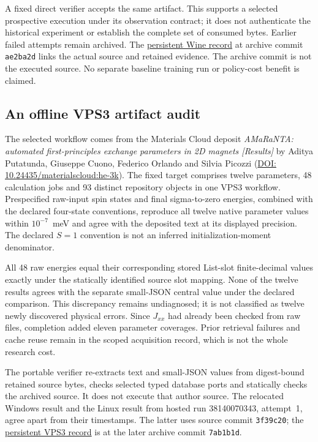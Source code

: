 \documentclass[pdflatex,sn-mathphys-num]{sn-jnl}
\theoremstyle{thmstyleone}
\theoremstyle{thmstylethree}
\theoremstyle{thmstyletwo}
\begin{document}
A fixed direct verifier accepts the same artifact. This supports a selected prospective execution under its observation contract; it does not authenticate the historical experiment or establish the complete set of consumed bytes. Earlier failed attempts remain archived. The \href{https://github.com/SHiJiE1115/newproj/blob/ae2ba2d6bd62dd7e7152f519d49569b91d235a1d/WINE_HOSTED_RUNS.md}{persistent Wine record} at archive commit \texttt{ae2ba2d} links the actual source and retained evidence. The archive commit is not the executed source. No separate baseline training run or policy-cost benefit is claimed.

\subsection{An offline VPS3 artifact audit}
The selected workflow comes from the Materials Cloud deposit \emph{AMaRaNTA: automated first-principles exchange parameters in 2D magnets [Results]} by Aditya Putatunda, Giuseppe Cuono, Federico Orlando and Silvia Picozzi (\href{https://doi.org/10.24435/materialscloud:he-3k}{DOI: 10.24435/materialscloud:he-3k}). The fixed target comprises twelve parameters, 48 calculation jobs and 93 distinct repository objects in one VPS3 workflow. Prespecified raw-input spin states and final sigma-to-zero energies, combined with the declared four-state conventions, reproduce all twelve native parameter values within $10^{-7}$~meV and agree with the deposited text at its displayed precision. The declared $S=1$ convention is not an inferred initialization-moment denominator.

All 48 raw energies equal their corresponding stored List-slot finite-decimal values exactly under the statically identified source slot mapping. None of the twelve results agrees with the separate small-JSON central value under the declared comparison. This discrepancy remains undiagnosed; it is not classified as twelve newly discovered physical errors. Since $J_{xx}$ had already been checked from raw files, completion added eleven parameter coverages. Prior retrieval failures and cache reuse remain in the scoped acquisition record, which is not the whole research cost.

The portable verifier re-extracts text and small-JSON values from digest-bound retained source bytes, checks selected typed database ports and statically checks the archived source. It does not execute that author source. The relocated Windows result and the Linux result from hosted run 38140070343, attempt~1, agree apart from their timestamps. The latter uses source commit \texttt{3f39c20}; the \href{https://github.com/SHiJiE1115/newproj/blob/7ab1b1dcca85068dc8b81683162699f1a8c3d060/VPS3_HOSTED_RUNS.md}{persistent VPS3 record} is at the later archive commit \texttt{7ab1b1d}.
\end{document}
